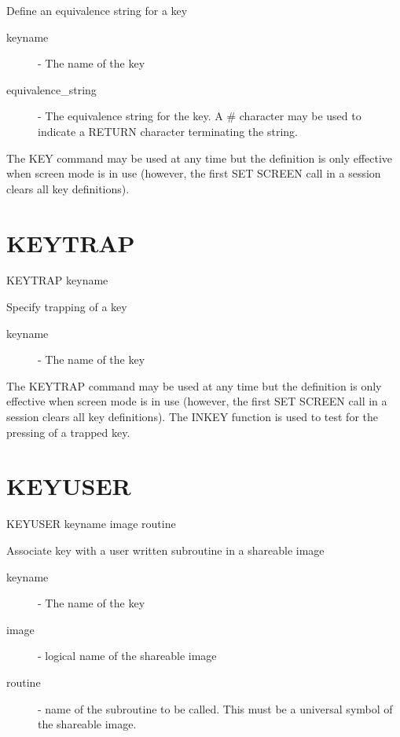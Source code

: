 \documentclass[twoside,11pt,nolof,chapters]{starlink}
\begin{document}
 Define an equivalence string for a key

\begin{description}

\item[keyname] -  The name of the key

\item[equivalence\_string]  -  The equivalence string for the key. A \#
              character may be used to indicate a RETURN character
              terminating the string.

\end{description}

The KEY command may be used at any time but the definition is only
effective when screen mode is in use (however, the first SET SCREEN call
in a session clears all key definitions).

\section{KEYTRAP\label{KEYTRAP}}

    KEYTRAP  \hspace{.5cm} keyname

 Specify trapping of a key

\begin{description}

\item[keyname] -  The name of the key

\end{description}

The KEYTRAP command may be used at any time but the definition is only
effective when screen mode is in use (however, the first SET SCREEN call
in a session clears all key definitions). The INKEY function is used to test
for the pressing of a trapped key.

\section{KEYUSER\label{KEYUSER}}

    KEYUSER  \hspace{.5cm} keyname  \hspace{.5cm} image \hspace{.5cm} routine

 Associate key with a user written subroutine in a shareable image

\begin{description}

\item[keyname] -  The name of the key

\item[image] - logical name of the shareable image

\item[routine] - name of the subroutine to be called. This must be a universal
symbol of the shareable image.

\end{description}
\end{document}
